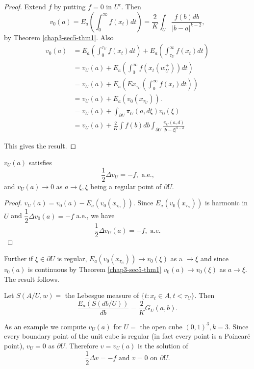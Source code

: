 \begin{proof}
Extend $f$ by putting $f=0$ in $U^c$. Then
  $$
  v_0 (a) = E_a \left(\int^\infty_0 f(x_t) dt\right) = \frac{2}{K} \int_U
  \frac{f(b) db}{| b-a|^{k-2}}, 
  $$
  by Theorem \ref{chap3-sec5-thm1}. Also
  \begin{align*}
    v_0 (a) & = E_a \left(\int^{\tau_U}_0 f(x_t) dt\right) + E_a
    \left(\int^\infty_{\tau_U} f(x_t) dt\right) \\ 
    & = v_U (a) + E_a \left(\int^\infty_0 f(x_t(w^+_U)) dt\right) \\
    & = v_U (a) + E_a \left(Ex_{\tau_U} \left(\int^\infty_0 f(x_t)
    dt\right)\right)\\ 
    & = v_U(a) + E_a (v_0(x_{\tau_U})).\\
    & = v_U (a) + \int_{\partial U} \pi_U (a, d \xi ) v_0 (\xi ) \\
    & = v_U (a) + \frac{2}{K} \int f(b)db \int_{\partial U}
    \frac{\pi_U (a,d)}{|b - \xi |^{k-2}} 
  \end{align*}\pageoriginale

This gives the result.
\end{proof}

\begin{thm}\label{chap3-sec5-thm5}%
$v_U(a)$ satisfies
$$
\frac{1}{2} \Delta v_U = - f, \text{ \ a.e.,}
$$
and $v_U (a) \rightarrow 0$ as $a \rightarrow \xi, \xi$ being a
regular point of $\partial U$. 
\end{thm}

\begin{proof}
$v_U(a) = v_0 (a) - E_a (v_0( x_{\tau_U}))$. Since $E_a (v_0
  (x_{\tau_U}))$ is harmonic in $U$ and $\dfrac{1}{2} \Delta v_0(a)
  = - f$ a.e., we have 
$$
\dfrac{1}{2} \Delta v_U(a) = - f,\text{ \  a.e.}
$$
\end{proof}

Further if $\xi \in \partial U$ is regular, $E_a (v_0(x_{\tau_U}))
\rightarrow v_0 (\xi)$ as a $\rightarrow \xi$ and since $v_0(a)$ is
continuous by Theorem \ref{chap3-sec5-thm1} $v_0(a) \rightarrow v_0
(\xi)$ as $a\rightarrow \xi$. The result follows.  

\begin{thm}\label{chap3-sec5-thm6}%

  Let $S (A/U, w) = $ the Lebesgue measure of $\{t : x_t \in A, t <
  \tau_U \}$. Then 
  $$
  \frac{E_a (S(db/U))}{db} = \frac{2}{K} G_U(a, b).
  $$
\end{thm}

As an example we compute $v_U(a)$ for $U=$ the open cube $(0, 1)^3 ,
k=3$. Since every boundary point of the unit cube is regular (in fact
every point is a Poincar\'e point), $v_U = 0$ as $\partial U$. Therefore
$v = v_U(a)$ is the solution of  
$$
\dfrac{1}{2} \Delta v = - f \text{ \ and \ } v = 0 \text{ \ on \ }
\partial U. 
$$\pageoriginale

